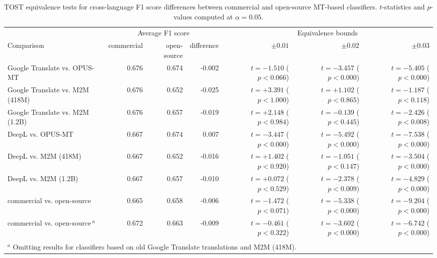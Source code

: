 \begin{table}[!t]

\caption{\label{tab:classifiers_f1_equivalence_overall}TOST equivalence tests for cross-language F1 score differences between commercial and open-source MT-based classifiers. $t$-statistics and $p$-values computed at $\alpha = 0.05$.}
\centering
\fontsize{10}{12}\selectfont
\begin{tabular}[t]{lrrrrrr}
\toprule
\multicolumn{1}{c}{ } & \multicolumn{3}{c}{Average F1 score} & \multicolumn{3}{c}{Equivalence bounds} \\
\cmidrule(l{3pt}r{3pt}){2-4} \cmidrule(l{3pt}r{3pt}){5-7}
Comparison & commercial & open-source & difference & $\pm 0.01$ & $\pm 0.02$ & $\pm 0.03$\\
\midrule
Google Translate vs. OPUS-MT & 0.676 & 0.674 & -0.002 & $t=-1.510$ ($p < 0.066$) & $t=-3.457$ ($p < 0.000$) & $t=-5.405$ ($p < 0.000$)\\
Google Translate vs. M2M (418M) & 0.676 & 0.652 & -0.025 & $t=+3.391$ ($p < 1.000$) & $t=+1.102$ ($p < 0.865$) & $t=-1.187$ ($p < 0.118$)\\
Google Translate vs. M2M (1.2B) & 0.676 & 0.657 & -0.019 & $t=+2.148$ ($p < 0.984$) & $t=-0.139$ ($p < 0.445$) & $t=-2.426$ ($p < 0.008$)\\
DeepL vs. OPUS-MT & 0.667 & 0.674 & 0.007 & $t=-3.447$ ($p < 0.000$) & $t=-5.492$ ($p < 0.000$) & $t=-7.538$ ($p < 0.000$)\\
DeepL vs. M2M (418M) & 0.667 & 0.652 & -0.016 & $t=+1.402$ ($p < 0.920$) & $t=-1.051$ ($p < 0.147$) & $t=-3.504$ ($p < 0.000$)\\
DeepL vs. M2M (1.2B) & 0.667 & 0.657 & -0.010 & $t=+0.072$ ($p < 0.529$) & $t=-2.378$ ($p < 0.009$) & $t=-4.829$ ($p < 0.000$)\\
commercial vs. open-source & 0.665 & 0.658 & -0.006 & $t=-1.472$ ($p < 0.071$) & $t=-5.338$ ($p < 0.000$) & $t=-9.204$ ($p < 0.000$)\\
commercial vs. open-source\,$^{a}$ & 0.672 & 0.663 & -0.009 & $t=-0.461$ ($p < 0.322$) & $t=-3.602$ ($p < 0.000$) & $t=-6.742$ ($p < 0.000$)\\
\bottomrule
\multicolumn{7}{l}{\textsuperscript{} $^{a}$ Omitting results for classifiers based on old Google Translate translations and M2M (418M).}\\
\end{tabular}
\end{table}
